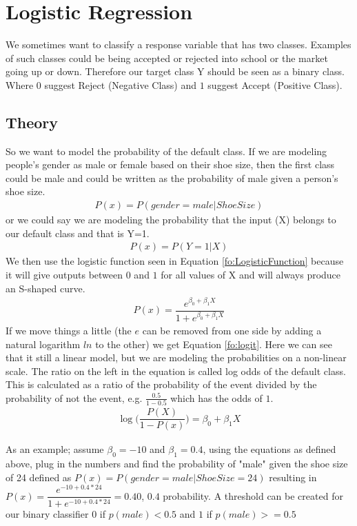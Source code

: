 \section{Logistic Regression}\label{sc:logisticRegression}
We sometimes want to classify a response variable that has two classes. Examples of such classes could be being accepted or rejected into school or the market going up or down. Therefore our target class Y should be seen as a binary class. Where $0$ suggest Reject (Negative Class) and $1$ suggest Accept (Positive Class).
\subsection{Theory}
So we want to model the probability of the default class. If we are modeling people’s gender as male or female based on their shoe size, then the first class could be male and could be written as the probability of male given a person’s shoe size.
\begin{align}
P(x) = P(gender=male|ShoeSize)
\end{align}
or we could say we are modeling the probability that the input (X) belongs to our default class and that is Y=1.
\begin{align}\label{fo:probability}
P(x) = P(Y=1|X)
\end{align}
We then use the logistic function seen in Equation \ref{fo:LogisticFunction} because it will give outputs between $0$ and $1$ for all values of X and will always produce an S-shaped curve.%
\begin{align}\label{fo:LogisticFunction}
P(x) = \dfrac{ e^{\beta_0 + \beta_1 X}}{  1 + e^{\beta_0 + \beta_1 X}}
\end{align}
If we move things a little (the $e$ can be removed from one side by adding a natural logarithm $ln$ to the other) we get Equation \ref{fo:logit}. Here we can see that it still a linear model, but we are modeling the probabilities on a non-linear scale. The ratio on the left in the equation is called log odds of the default class. This is calculated as a ratio of the probability of the event divided by the probability of not the event, e.g. $\frac{0.5}{1-0.5}$ which has the odds of $1$.
 \begin{align}\label{fo:logit}
\log\bigg( \dfrac{ P(X)}{1-P(x)} \bigg) = \beta_0 + \beta_1 X
\end{align}

As an example; assume $\beta_0 = -10 $ and $ \beta_1 = 0.4 $, using the equations as defined above, plug in the numbers and find the probability of "male" given the shoe size of 24 defined as $P(x) = P(gender=male|ShoeSize=24)$ resulting in $P(x) = \dfrac{ e^{-10 + 0.4*24}}{1 + e^{-10 + 0.4*24}} = 0.40$, $0.4$ probability. A threshold can be created for our binary classifier $0$ if $p(male) < 0.5$ and $1$ if $ p(male) >= 0.5$

